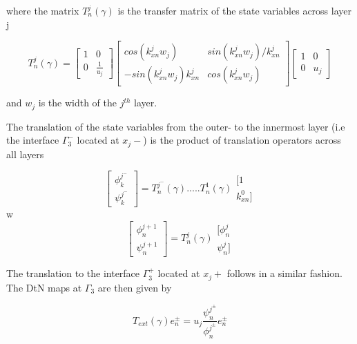 where the matrix $T_n^j(\gamma)$ is the transfer matrix of the state
variables across layer j

\begin{equation}
T_n^j(\gamma) = \left[ \begin{array}{cc} 1 & 0 \\
0 & \frac{1}{u_j} \end{array} \right]
\left[ \begin{array}{cc}  cos(k_{xn}^j w_j) & sin(k_{xn}^j
 w_j)/k_{xn}^j \\
-sin(k_{xn}^j w_j) k_{xn}^j & cos(k_{xn}^j w_j) \end{array}
\right]\left[ \begin{array}{cc} 1 & 0 \\
0 & u_j \end{array} \right]
\end{equation}

and $w_j$ is the width of the $j^{th}$ layer.

The translation of the state variables from the outer- to the
innermost layer (i.e the interface $\Gamma_3^-$ located at $x_j-$) is
the product of translation operators across all layers

\begin{equation}
\left[ \begin{array}{ll} \phi_k^{j^-} \\ \psi_k^{j^-}
\end{array} \right] = T_n^{j^-}(\gamma) ..... T_n^1(\gamma)
\begin{array}{ll} [1 \\ k_{xn}^0] \end{array}
\end{equation}
w\begin{equation}
\left[ \begin{array}{ll} \phi_n^{j+1} \\ \psi_n^{j+1}
\end{array} \right] = T_n^j(\gamma)
\begin{array}{ll} [\phi_n^{j} \\ \psi_n^{j}] \end{array}
\end{equation}

The translation to the interface $\Gamma_3^+$ located at $x_j+$
follows in a similar fashion. The DtN maps at $\Gamma_3$ are then
given by 

\begin{equation}
T_{ext}(\gamma) e_n^\pm = u_j \frac{\psi_n^{j^\pm}}{\phi_n^{j^\pm}} e_n^\pm
\end{equation}

